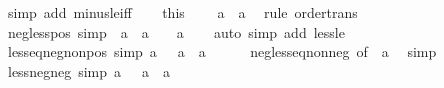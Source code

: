 \begin{isabellebody}
\ {\isacharparenleft}{\kern0pt}simp\ add{\isacharcolon}{\kern0pt}\ minus{\isacharunderscore}{\kern0pt}le{\isacharunderscore}{\kern0pt}iff{\isacharparenright}{\kern0pt}\isanewline
\ \ \isamarkupfalse%
\ this\ {\isacharasterisk}{\kern0pt}\ \isamarkupfalse%
\ {\isachardoublequoteopen}{\isacharminus}{\kern0pt}\ a\ {\isasymle}\ a{\isachardoublequoteclose}\ \isamarkupfalse%
\ {\isacharparenleft}{\kern0pt}rule\ order{\isacharunderscore}{\kern0pt}trans{\isacharparenright}{\kern0pt}\isanewline
{}\isamarkupfalse%
%
\endisatagproof
{\isafoldproof}%
%
\isadelimproof
\isanewline
%
\endisadelimproof
\isanewline
{}\isamarkupfalse%
\ neg{\isacharunderscore}{\kern0pt}less{\isacharunderscore}{\kern0pt}pos\ {\isacharbrackleft}{\kern0pt}simp{\isacharbrackright}{\kern0pt}{\isacharcolon}{\kern0pt}\ {\isachardoublequoteopen}{\isacharminus}{\kern0pt}\ a\ {\isacharless}{\kern0pt}\ a\ {\isasymlongleftrightarrow}\ {}\ {\isacharless}{\kern0pt}\ a{\isachardoublequoteclose}\isanewline
%
\isadelimproof
\ \ %
\endisadelimproof
%
\isatagproof
{}\isamarkupfalse%
\ {\isacharparenleft}{\kern0pt}auto\ simp\ add{\isacharcolon}{\kern0pt}\ less{\isacharunderscore}{\kern0pt}le{\isacharparenright}{\kern0pt}%
\endisatagproof
{\isafoldproof}%
%
\isadelimproof
\isanewline
%
\endisadelimproof
\isanewline
{}\isamarkupfalse%
\ less{\isacharunderscore}{\kern0pt}eq{\isacharunderscore}{\kern0pt}neg{\isacharunderscore}{\kern0pt}nonpos\ {\isacharbrackleft}{\kern0pt}simp{\isacharbrackright}{\kern0pt}{\isacharcolon}{\kern0pt}\ {\isachardoublequoteopen}a\ {\isasymle}\ {\isacharminus}{\kern0pt}\ a\ {\isasymlongleftrightarrow}\ a\ {\isasymle}\ {}{\isachardoublequoteclose}\isanewline
%
\isadelimproof
\ \ %
\endisadelimproof
%
\isatagproof
{}\isamarkupfalse%
\ neg{\isacharunderscore}{\kern0pt}less{\isacharunderscore}{\kern0pt}eq{\isacharunderscore}{\kern0pt}nonneg\ {\isacharbrackleft}{\kern0pt}of\ {\isachardoublequoteopen}{\isacharminus}{\kern0pt}\ a{\isachardoublequoteclose}{\isacharbrackright}{\kern0pt}\ \isamarkupfalse%
\ simp%
\endisatagproof
{\isafoldproof}%
%
\isadelimproof
\isanewline
%
\endisadelimproof
\isanewline
{}\isamarkupfalse%
\ less{\isacharunderscore}{\kern0pt}neg{\isacharunderscore}{\kern0pt}neg\ {\isacharbrackleft}{\kern0pt}simp{\isacharbrackright}{\kern0pt}{\isacharcolon}{\kern0pt}\ {\isachardoublequoteopen}a\ {\isacharless}{\kern0pt}\ {\isacharminus}{\kern0pt}\ a\ {\isasymlongleftrightarrow}\ a\ {\isacharless}{\kern0pt}\ {}{\isachardoublequoteclose}\isanewline

\end{isabellebody}
